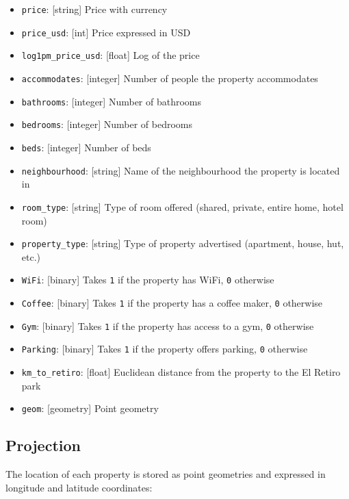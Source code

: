 \documentclass[
]{book}
\providecommand{\tightlist}{%
  \setlength{\itemsep}{0pt}\setlength{\parskip}{0pt}}
\begin{document}
\begin{itemize}
\tightlist
\item
  \texttt{price}: {[}string{]} Price with currency
\item
  \texttt{price\_usd}: {[}int{]} Price expressed in USD
\item
  \texttt{log1pm\_price\_usd}: {[}float{]} Log of the price
\item
  \texttt{accommodates}: {[}integer{]} Number of people the property accommodates
\item
  \texttt{bathrooms}: {[}integer{]} Number of bathrooms
\item
  \texttt{bedrooms}: {[}integer{]} Number of bedrooms
\item
  \texttt{beds}: {[}integer{]} Number of beds
\item
  \texttt{neighbourhood}: {[}string{]} Name of the neighbourhood the property is located in
\item
  \texttt{room\_type}: {[}string{]} Type of room offered (shared, private, entire home, hotel room)
\item
  \texttt{property\_type}: {[}string{]} Type of property advertised (apartment, house, hut, etc.)
\item
  \texttt{WiFi}: {[}binary{]} Takes \texttt{1} if the property has WiFi, \texttt{0} otherwise
\item
  \texttt{Coffee}: {[}binary{]} Takes \texttt{1} if the property has a coffee maker, \texttt{0} otherwise
\item
  \texttt{Gym}: {[}binary{]} Takes \texttt{1} if the property has access to a gym, \texttt{0} otherwise
\item
  \texttt{Parking}: {[}binary{]} Takes \texttt{1} if the property offers parking, \texttt{0} otherwise
\item
  \texttt{km\_to\_retiro}: {[}float{]} Euclidean distance from the property to the El Retiro park
\item
  \texttt{geom}: {[}geometry{]} Point geometry
\end{itemize}

\hypertarget{projection}{%
\subsection*{Projection}\label{projection}}

The location of each property is stored as point geometries and expressed in longitude and latitude coordinates:
\end{document}
